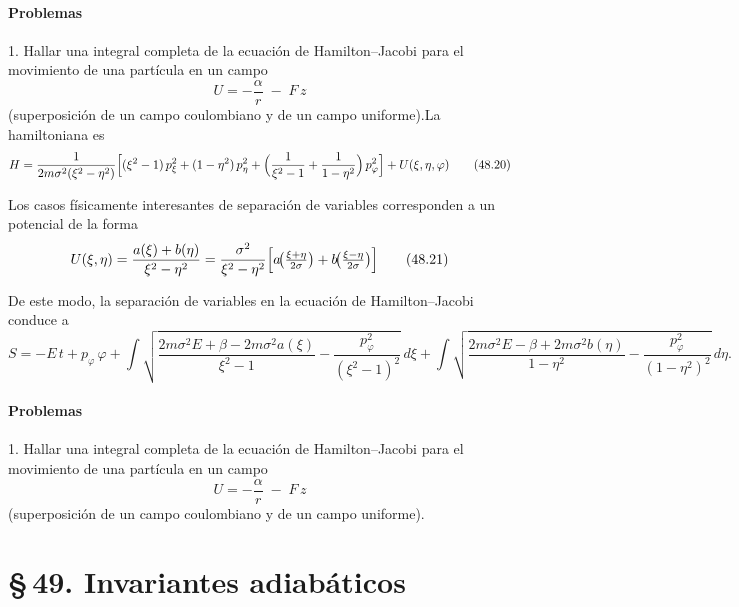 \documentclass[12pt]{article}
\begin{document}
\paragraph*{Problemas}

1. Hallar una integral completa de la ecuación de Hamilton–Jacobi para el movimiento de una partícula en un campo  
\[
U = -\frac{\alpha}{r}\;-\;F\,z
\]
(superposición de un campo coulombiano y de un campo uniforme).\noindent La hamiltoniana es
\begin{equation}
H = \frac{1}{2m\sigma^{2}(\xi^{2}-\eta^{2})}
\Bigl[
(\xi^{2}-1)\,p_{\xi}^{2} + (1-\eta^{2})\,p_{\eta}^{2}
+ \Bigl(\frac{1}{\xi^{2}-1} + \frac{1}{1-\eta^{2}}\Bigr)\,p_{\varphi}^{2}
\Bigr]
+ U(\xi,\eta,\varphi)
\tag{48.20}
\end{equation}

\noindent Los casos físicamente interesantes de separación de variables corresponden a un potencial de la forma
\begin{equation}
U(\xi,\eta)
= \frac{a(\xi)+b(\eta)}{\xi^{2}-\eta^{2}}
= \frac{\sigma^{2}}{\xi^{2}-\eta^{2}}
\Bigl[
a\!\bigl(\tfrac{\xi+\eta}{2\sigma}\bigr)
+ b\!\bigl(\tfrac{\xi-\eta}{2\sigma}\bigr)
\Bigr]
\tag{48.21}
\end{equation}

\noindent De este modo, la separación de variables en la ecuación de Hamilton–Jacobi conduce a
\begin{equation}
S = -E\,t + p_{\varphi}\,\varphi
+ \int 
\sqrt{
\frac{2m\sigma^{2}E + \beta - 2m\sigma^{2}a(\xi)}{\xi^{2}-1}
- \frac{p_{\varphi}^{2}}{(\xi^{2}-1)^{2}}
}
\,d\xi
+ \int 
\sqrt{
\frac{2m\sigma^{2}E - \beta + 2m\sigma^{2}b(\eta)}{1-\eta^{2}}
- \frac{p_{\varphi}^{2}}{(1-\eta^{2})^{2}}
}
\,d\eta.
\tag{48.22}
\end{equation}

\paragraph*{Problemas}

1. Hallar una integral completa de la ecuación de Hamilton–Jacobi para el movimiento de una partícula en un campo  
\[
U = -\frac{\alpha}{r}\;-\;F\,z
\]
(superposición de un campo coulombiano y de un campo uniforme).

\section*{\S\,49. Invariantes adiabáticos}
\end{document}
